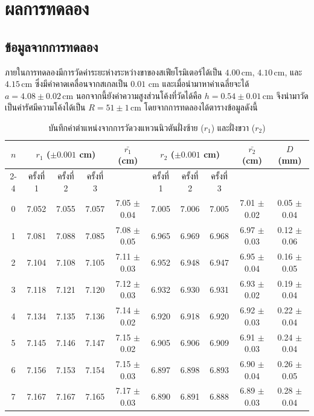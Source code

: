 \documentclass[11pt,a4paper]{article}
\begin{document}
\newpage
\section{ผลการทดลอง} \label{result}

\subsection{ข้อมูลจากการทดลอง} \label{data}
ภายในการทดลองมีการวัดค่าระยะห่างระหว่างขาของสเฟียโรมิเตอร์ได้เป็น $4.00 \, \text{cm}$, $4.10 \, \text{cm}$, และ $4.15 \, \text{cm}$ ซึ่งมีค่าคาดเคลื่อนจากสเกลเป็น $0.01$ cm และเมื่อนำมาหาค่าเฉลี่ยจะได้ $a = 4.08 \pm 0.02 \, \text{cm}$ นอกจากนี้ยังค่าความสูงส่วนโค้งที่วัดได้คือ $h = 0.54 \pm 0.01\,\text{cm}$ จึงนำมาวัดเป็นค่ารัศมีความโค้งได้เป็น $R = 51 \pm 1 \, \text{cm}$
โดยจากการทดลองได้ตารางข้อมูลดังนี้

\begin{table}[htbp]
\centering
\caption{บันทึกค่าตำแหน่งจากการวัดวงแหวนนิวตันฝั่งซ้าย ($r_1$) และฝั่งขวา ($r_2$)}
\renewcommand{\arraystretch}{1.2}
\begin{tabular}{|c|ccc|c|ccc|c|c|}
\hline
\multirow{2}{*}{$n$} 
& \multicolumn{3}{c|}{$r_1$ ($\pm 0.001$ cm)} 
& \multirow{2}{*}{$\bar{r_1}$  (cm)}
& \multicolumn{3}{c|}{$r_2$ ($\pm 0.001$ cm)} 
& \multirow{2}{*}{$\bar{r_2}$ (cm)}
& \multirow{2}{*}{$D$ (mm)} \\
\cline{2-4} \cline{6-8}
& ครั้งที่ 1 & ครั้งที่ 2 & ครั้งที่ 3 & & ครั้งที่ 1 & ครั้งที่ 2 & ครั้งที่ 3 & & \\
\hline
0 & 7.052 & 7.055 & 7.057 & 7.05 $\pm$ 0.04 & 7.005 & 7.006 & 7.005 & 7.01 $\pm$ 0.02 & 0.05 $\pm$ 0.04 \\
1 & 7.081 & 7.088 & 7.085 & 7.08 $\pm$ 0.05 & 6.965 & 6.969 & 6.968 & 6.97 $\pm$ 0.03 & 0.12 $\pm$ 0.06 \\
2 & 7.104 & 7.108 & 7.105 & 7.11 $\pm$ 0.03 & 6.952 & 6.948 & 6.947 & 6.95 $\pm$ 0.04 & 0.16 $\pm$ 0.05 \\
3 & 7.118 & 7.121 & 7.120 & 7.12 $\pm$ 0.03 & 6.932 & 6.930 & 6.931 & 6.93 $\pm$ 0.02 & 0.19 $\pm$ 0.04 \\
4 & 7.134 & 7.135 & 7.136 & 7.14 $\pm$ 0.02 & 6.920 & 6.918 & 6.920 & 6.92 $\pm$ 0.03 & 0.22 $\pm$ 0.04 \\
5 & 7.145 & 7.146 & 7.147 & 7.15 $\pm$ 0.02 & 6.905 & 6.906 & 6.909 & 6.91 $\pm$ 0.03 & 0.24 $\pm$ 0.04 \\
6 & 7.156 & 7.153 & 7.154 & 7.15 $\pm$ 0.03 & 6.897 & 6.898 & 6.893 & 6.90 $\pm$ 0.04 & 0.26 $\pm$ 0.05 \\
7 & 7.167 & 7.167 & 7.165 & 7.17 $\pm$ 0.03 & 6.890 & 6.891 & 6.888 & 6.89 $\pm$ 0.03 & 0.28 $\pm$ 0.04 \\
\hline
\end{tabular}
\end{table}
\end{document}
